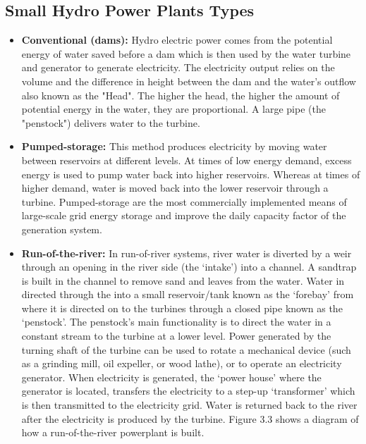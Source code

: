 \subsection{Small Hydro Power Plants Types}
\begin{itemize}
\item \textbf{Conventional (dams):} Hydro electric power comes from the potential energy of water saved before a dam which is then used by the water turbine and generator to generate electricity. The electricity output relies on the volume and the difference in height between the dam and the water's outflow also known as the "Head". The higher the head, the higher the amount of potential energy in the water, they are proportional. A large pipe (the "penstock") delivers water to the turbine.\cite{HydroPP} 
\item \textbf{Pumped-storage:} This method produces electricity by moving water between reservoirs at different levels. At times of low energy demand, excess energy is used to pump water back into higher reservoirs. Whereas at times of higher demand, water is moved back into the lower reservoir through a turbine.\cite{HydroPP} Pumped-storage are the most commercially implemented means of large-scale grid energy storage and improve the daily capacity factor of the generation system.\cite{HydroPP}
\item \textbf{Run-of-the-river:} In run-of-river systems, river water is diverted by a weir through an opening in the river side (the ‘intake’) into a channel.\cite{HydroPower} A sandtrap is built in the channel to remove sand and leaves from the water. Water in directed through the into a small reservoir/tank known as the ‘forebay’ from where it is directed on to the turbines through a closed pipe known as the ‘penstock’.\cite{HydroPower} The penstock's main functionality is to direct the water in a constant stream to the turbine at a lower level. Power generated by the turning shaft of the turbine can be used to rotate a mechanical device (such as a grinding mill, oil expeller, or wood lathe), or to operate an electricity generator.\cite{HydroPower} When electricity is generated, the ‘power house’ where the generator is located, transfers the electricity to a step-up ‘transformer’ which is then transmitted to the electricity grid. Water is returned back to the river after the electricity is produced by the turbine.\cite{HydroPower} Figure 3.3 shows a diagram of how a run-of-the-river powerplant is built.


\end{itemize}
